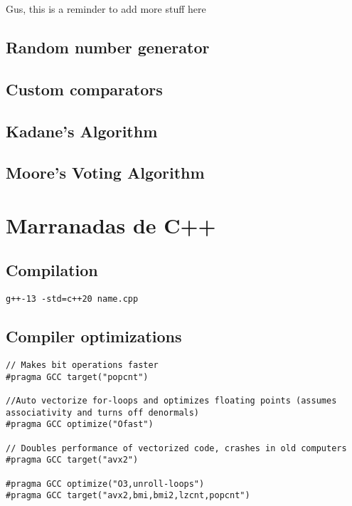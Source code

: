 \documentclass[10pt]{article}
\begin{document}
\begin{multicols*}{2}
Gus, this is a reminder to add more stuff here

\subsection{Random number generator}


\subsection{Custom comparators}


\subsection{Kadane's Algorithm}


\subsection{Moore's Voting Algorithm}


\section{Marranadas de C++}

\subsection{Compilation}

\texttt{g++-13 -std=c++20 name.cpp}

\subsection{Compiler optimizations}


\begin{lstlisting}[style=compactcpp]
// Makes bit operations faster
#pragma GCC target("popcnt") 

//Auto vectorize for-loops and optimizes floating points (assumes associativity and turns off denormals)
#pragma GCC optimize("Ofast")

// Doubles performance of vectorized code, crashes in old computers
#pragma GCC target("avx2")

#pragma GCC optimize("O3,unroll-loops")
#pragma GCC target("avx2,bmi,bmi2,lzcnt,popcnt")
\end{lstlisting}


\end{multicols*}
\end{document}
